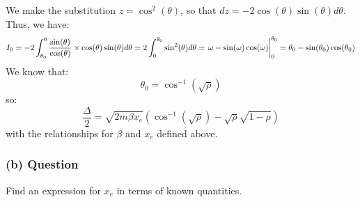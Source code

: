 \documentclass{article}
\begin{document}
We make the substitution $z = \cos^2(\theta)$, so that $dz = -2\cos(\theta)\sin(\theta)d\theta$. Thus, we have:
\begin{equation}
    I_0 = -2\int_{\theta _0}^{0}\frac{\sin(\theta )}{\cos(\theta )}\times \cos(\theta )\sin(\theta )d\theta = 2\int_{0}^{\theta _0}\sin^2(\theta )d\theta = \eval{\omega - \sin(\omega)\cos(\omega)}_0^{\theta _0} = \theta _0 - \sin(\theta _0)\cos(\theta _0)
\end{equation}
We know that:
\begin{equation}
    \theta _0 = \cos^{-1}(\sqrt{\rho } )
\end{equation}
so:
\begin{equation}
    \frac{\Delta  }{2} = \sqrt{2m\beta x_e}\left(\cos^{-1}(\sqrt{\rho })-\sqrt{\rho }\sqrt{1-\rho }\right)
\end{equation}
with the relationships for $\beta $ and $x_e$ defined above.

\subsubsection*{(b) Question}
Find an expression for \( x_e \) in terms of known quantities.
\end{document}
